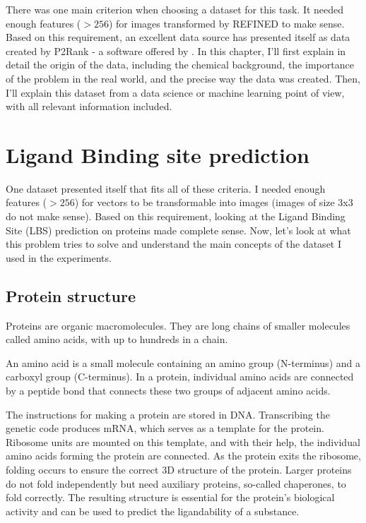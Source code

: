 There was one main criterion when choosing a dataset for this task. It needed enough features ($> 256$) for images transformed by REFINED to make sense. Based on this requirement, an excellent data source has presented itself as data created by P2Rank - a software offered by \cite{P2RANK}. In this chapter, I'll first explain in detail the origin of the data, including the chemical background, the importance of the problem in the real world, and the precise way the data was created. Then, I'll explain this dataset from a data science or machine learning point of view, with all relevant information included. 

\section{Ligand Binding site prediction}

One dataset presented itself that fits all of these criteria. I needed enough features ($> 256$) for vectors to be transformable into images (images of size 3x3 do not make sense). Based on this requirement, looking at the Ligand Binding Site (LBS) prediction on proteins made complete sense. Now, let's look at what this problem tries to solve and understand the main concepts of the dataset I used in the experiments. 

\subsection{Protein structure}
\label{Protein_description}

Proteins are organic macromolecules. They are long chains of smaller molecules called amino acids, with up to hundreds in a chain.

An amino acid is a small molecule containing an amino group (N-terminus) and a carboxyl group (C-terminus). In a protein, individual amino acids are connected by a peptide bond that connects these two groups of adjacent amino acids.

The instructions for making a protein are stored in DNA. Transcribing the genetic code produces mRNA, which serves as a template for the protein. Ribosome units are mounted on this template, and with their help, the individual amino acids forming the protein are connected. As the protein exits the ribosome, folding occurs to ensure the correct 3D structure of the protein. Larger proteins do not fold independently but need auxiliary proteins, so-called chaperones, to fold correctly. The resulting structure is essential for the protein's biological activity and can be used to predict the ligandability of a substance.

